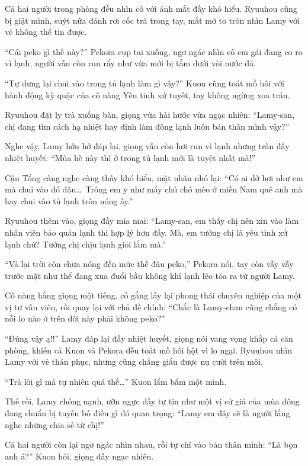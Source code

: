 \documentclass[../main.tex]{subfiles}
\begin{document}

Cả hai người trong phòng đều nhìn cô với ánh mắt đầy khó hiểu. Ryuuhou cũng bị giật mình, suýt nữa đánh rơi cốc trà trong tay, mắt mở to tròn nhìn Lamy với vẻ không thể tin được.

``Cái peko gì thế này?'' Pekora cụp tai xuống, ngơ ngác nhìn cô em gái đang co ro vì lạnh, người vẫn còn run rẩy như vừa mới bị tắm dưới vòi nước đá.

``Tự dưng lại chui vào trong tủ lạnh làm gì vậy?'' Kuon cũng toát mồ hôi với hành động kỳ quặc của cô nàng Yêu tinh xứ tuyết, tay không ngừng xoa trán.

Ryuuhou đặt ly trà xuống bàn, giọng vừa hài hước vừa ngạc nhiên: ``Lamy-san, chị đang tìm cách hạ nhiệt hay định làm đông lạnh luôn bản thân mình vậy?''

Nghe vậy, Lamy hớn hở đáp lại, giọng vẫn còn hơi run vì lạnh nhưng tràn đầy nhiệt huyết: ``Mùa hè này thì ở trong tủ lạnh mới là tuyệt nhất mà!''

Cậu Tổng càng nghe càng thấy khó hiểu, mặt nhăn nhó lại: ``Có ai dở hơi như em mà chui vào đó đâu\dots\ Trông em y như mấy chú chó mèo ở miền Nam quê anh mà hay chui vào tủ lạnh trốn nóng ấy.''

Ryuuhou thêm vào, giọng đầy mỉa mai: ``Lamy-san, em thấy chị nên xin vào làm nhân viên bảo quản lạnh thì hợp lý hơn đấy. Mà, em tưởng chị là yêu tinh xứ lạnh chứ? Tưởng chị chịu lạnh giỏi lắm mà.''

``Vả lại trời còn chưa nóng đến mức thế đâu peko,'' Pekora nói, tay còn vẫy vẫy trước mặt như thể đang xua đuổi bầu không khí lạnh lẽo tỏa ra từ người Lamy.

Cô nàng hắng giọng một tiếng, cố gắng lấy lại phong thái chuyên nghiệp của một vị tư vấn viên, rồi quay lại với chủ đề chính: ``Chắc là Lamy-chan cũng chẳng có nỗi lo nào ở trên đời này phải không peko?''

``Đúng vậy ạ!!'' Lamy đáp lại đầy nhiệt huyết, giọng nói vang vọng khắp cả căn phòng, khiến cả Kuon và Pekora đều toát mồ hôi hột vì lo ngại. Ryuuhou nhìn Lamy với vẻ thán phục, nhưng cũng chẳng giấu được nụ cười trên môi.

``Trả lời gì mà tự nhiên quá thế\dots'' Kuon lẩm bẩm một mình.

Thế rồi, Lamy chống nạnh, ưỡn ngực đầy tự tin như một vị sứ giả của mùa đông đang chuẩn bị tuyên bố điều gì đó quan trọng: ``Lamy em đây sẽ là người lắng nghe những chia sẻ từ chị!''

Cả hai người còn lại ngơ ngác nhìn nhau, rồi tự chỉ vào bản thân mình: ``Là bọn anh á?'' Kuon hỏi, giọng đầy ngạc nhiên.
\end{document}
